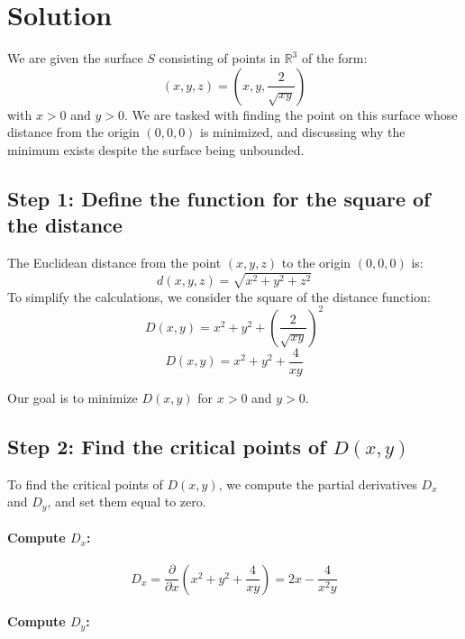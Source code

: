 \documentclass[11pt]{article}
\begin{document}
\newpage



\newpage

\section{Solution}

We are given the surface \( S \) consisting of points in \( \mathbb{R}^3 \) of the form:
\[
(x, y, z) = \left( x, y, \frac{2}{\sqrt{xy}} \right)
\]
with \( x > 0 \) and \( y > 0 \). We are tasked with finding the point on this surface whose distance from the origin \( (0, 0, 0) \) is minimized, and discussing why the minimum exists despite the surface being unbounded.

\newpage

\subsection{Step 1: Define the function for the square of the distance}

The Euclidean distance from the point \( (x, y, z) \) to the origin \( (0, 0, 0) \) is:
\[
d(x, y, z) = \sqrt{x^2 + y^2 + z^2}
\]
To simplify the calculations, we consider the square of the distance function:
\[
D(x, y) = x^2 + y^2 + \left( \frac{2}{\sqrt{xy}} \right)^2
\]
\[
D(x, y) = x^2 + y^2 + \frac{4}{xy}
\]

Our goal is to minimize \( D(x, y) \) for \( x > 0 \) and \( y > 0 \).

\newpage

\subsection{Step 2: Find the critical points of \( D(x, y) \)}

To find the critical points of \( D(x, y) \), we compute the partial derivatives \( D_x \) and \( D_y \), and set them equal to zero.

\paragraph{Compute \( D_x \):}

\[
D_x = \frac{\partial}{\partial x} \left( x^2 + y^2 + \frac{4}{xy} \right) = 2x - \frac{4}{x^2y}
\]

\paragraph{Compute \( D_y \):}
\end{document}
